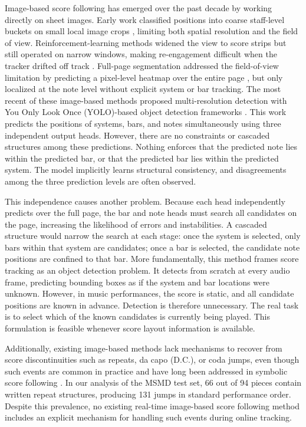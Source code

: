 \documentclass{article}
\begin{document}
Image-based score following has emerged over the past decade by working directly on sheet images. Early work classified positions into coarse staff-level buckets on small local image crops \cite{dorfer2016towards}, limiting both spatial resolution and the field of view. Reinforcement-learning methods widened the view to score strips but still operated on narrow windows, making re-engagement difficult when the tracker drifted off track \cite{dorfer2018rl,henkel2019score}. Full-page segmentation addressed the field-of-view limitation by predicting a pixel-level heatmap over the entire page \cite{henkel2020learning}, but only localized at the note level without explicit system or bar tracking. The most recent of these image-based methods proposed multi-resolution detection with You Only Look Once (YOLO)-based object detection frameworks \cite{henkel2021real}. This work predicts the positions of systems, bars, and notes simultaneously using three independent output heads. However, there are no constraints or cascaded structures among these predictions. Nothing enforces that the predicted note lies within the predicted bar, or that the predicted bar lies within the predicted system. The model implicitly learns structural consistency, and disagreements among the three prediction levels are often observed.

This independence causes another problem. Because each head independently predicts over the full page, the bar and note heads must search all candidates on the page, increasing the likelihood of errors and instabilities. A cascaded structure would narrow the search at each stage: once the system is selected, only bars within that system are candidates; once a bar is selected, the candidate note positions are confined to that bar. More fundamentally, this method frames score tracking as an object detection problem. It detects from scratch at every audio frame, predicting bounding boxes as if the system and bar locations were unknown. However, in music performances, the score is static, and all candidate positions are known in advance. Detection is therefore unnecessary. The real task is to select which of the known candidates is currently being played. This formulation is feasible whenever score layout information is available. 

Additionally, existing image-based methods lack mechanisms to recover from score discontinuities such as repeats, da capo (D.C.), or coda jumps, even though such events are common in practice and have long been addressed in symbolic score following \cite{nakamura2016real,morsi2022bottlenecks,park2025matchmaker}. In our analysis of the MSMD test set, 66 out of 94 pieces contain written repeat structures, producing 131 jumps in standard performance order. Despite this prevalence, no existing real-time image-based score following method includes an explicit mechanism for handling such events during online tracking.
\end{document}
